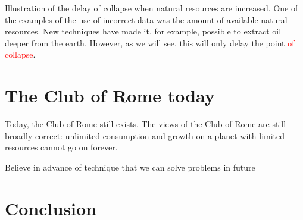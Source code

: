 \documentclass[10pt,a4paper]{scrartcl}
\begin{document}
Illustration of the delay of collapse when natural resources are increased. One of the examples of the use of incorrect data was the amount of available natural resources. New techniques have made it, for example, possible to extract oil deeper from the earth. However, as we will see, this will only delay the point \textcolor{red}{of collapse}.

\section*{The Club of Rome today}

Today, the Club of Rome still exists. The views of the Club of Rome are still broadly correct: unlimited consumption and growth on a planet with limited resources cannot go on forever.

Believe in advance of technique that we can solve problems in future

\section*{Conclusion}


\nocite{*}

\end{document}
